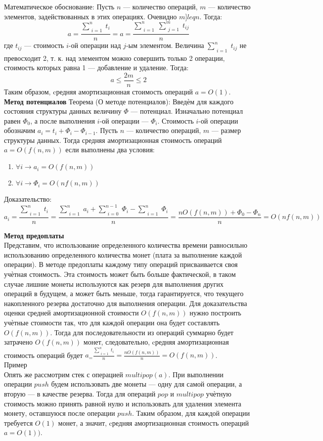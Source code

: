 \documentclass[a4paper]{article}
\begin{document}
Математическое обоснование:
Пусть $n$ — количество операций, $m$ — количество элементов, задействованных в этих операциях. Очевидно $m ]leq n$. Тогда:
$$ a = \frac{\sum_{\substack{i=1}}^n t_i}{n} = a= \frac{\sum_{\substack{i=1}}^n \sum_{\substack{j=1}}^m t_{ij}}{n} $$
где $t_{ij}$ — стоимость $i$-ой операции над $j$-ым элементом. Величина $\sum_{\substack{i=1}}^n t_{ij}$ не превосходит 2, т. к. над элементом можно совершить только 2 операции, стоимость которых равна 1 — добавление и удаление. Тогда:
$$ a \leq \frac{2m}{n} \leq 2 $$
Таким образом, cредняя амортизационная стоимость операций $a=O(1)$. \\

\textbf{Метод потенциалов}
Теорема (О методе потенциалов): Введѐм для каждого состояния структуры данных величину $\Phi$ — потенциал. Изначально потенциал равен $\Phi_0$, а после выполнения $i$-ой операции — $\Phi_i$. Стоимость $i$-ой операции обозначим $a_i = t_i + \Phi_i - \Phi_{i-1}$. Пусть $n$ — количество операций, $m$ — размер структуры данных. Тогда средняя амортизационная стоимость операций $a=O(f(n,m))$ если выполнены два условия:
\begin{enumerate}
	\item $\forall i \rightarrow a_i = O(f(n,m))$
	\item $\forall i \rightarrow \Phi_i = O(nf(n,m))$
\end{enumerate}
Доказательство: 
$$ a_i = \frac{\sum_{\substack{i=1}}^n t_i}{n} = \frac{\sum_{\substack{i=1}}^n a_i + \sum_{\substack{i=0}}^{n-1} \Phi_i - \sum_{\substack{i=1}}^n \Phi_i}{n} = \frac{nO(f(n,m)) + \Phi_0 - \Phi_n}{n} = O(nf(n,m)) $$

\textbf{Метод предоплаты} \\
Представим, что использование определенного количества времени равносильно использованию определенного количества монет (плата за выполнение каждой операции). В методе предоплаты каждому типу операций присваивается своя учѐтная стоимость. Эта стоимость может быть больше фактической, в таком случае лишние монеты используются как резерв для выполнения других операций в будущем, а может быть меньше, тогда гарантируется, что текущего накопленного резерва достаточно для выполнения операции. Для доказательства оценки средней амортизационной стоимости $O(f(n,m))$ нужно построить учѐтные стоимости так, что для каждой операции она будет составлять $O(f(n,m))$. Тогда для последовательности из операций суммарно будет затрачено $O(f(n,m))$ монет, следовательно, cредняя амортизационная стоимость операций будет $a_ = \frac{\sum_{\substack{i=1}}^n t_i}{n} = \frac{nO(f(n,m))}{n} = O(f(n,m))$. \\
Пример \\
Опять же рассмотрим стек с операцией $multipop(a)$. При выполнении операции $push$ будем использовать две монеты — одну для самой операции, а вторую — в качестве резерва. Тогда для операций $pop$ и $multipop$ учѐтную стоимость можно принять равной нулю и использовать для удаления элемента монету, оставшуюся после операции $push$. Таким образом, для каждой операции требуется $O(1)$ монет, а значит, cредняя амортизационная стоимость операций $a=O(1))$.
\end{document}
